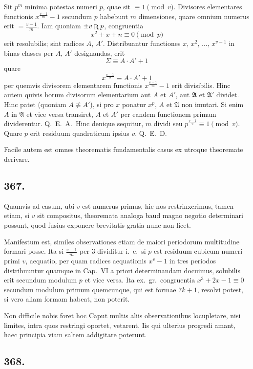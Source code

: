 \documentclass[12pt]{article}
\begin{document}
Sit $p^m$ minima potestas numeri $p$, quae sit $\equiv 1\pmod{v}$. Divisores elementares functionis $x^{\frac{v-1}{m}}-1$ secundum $p$ habebunt $m$ dimensiones, quare omnium numerus erit $=\frac{v-1}{m}$. Iam quoniam $\pm v\mathbin{\raisebox{-1.5pt}{\smash{R}}}p$, congruentia
\[
x^2+x+n\equiv 0 \pmod{p}
\]
erit resolubilis; sint radices $A$, $A'$. Distribuantur functiones $x$, $x^2$, $\ldots$, $x^{v-1}$ in binas classes per $A$, $A'$ designandas, erit
\[
\Sigma\equiv A\cdot A'+1
\]
quare
\[
x^{\frac{v-1}{2}}\equiv A\cdot A'+1
\]
per quemvis divisorem elementarem functionis $x^{\frac{v-1}{m}}-1$ erit divisibilis. Hinc autem quivis horum divisorum elementarium aut $A$ et $A'$, aut $\mathfrak{A}$ et $\mathfrak{A}'$ dividet. Hinc patet (quoniam $A\not\equiv A'$), si pro $x$ ponatur $x^p$, $A$ et $\mathfrak{A}$ non imutari. Si enim $A$ in $\mathfrak{A}$ et vice versa transiret, $A$ et $A'$ per eandem functionem primam dividerentur. Q.~E.~A.~Hinc denique sequitur, $m$ dividi seu $p^{\frac{v-1}{2}}\equiv 1\pmod{v}$. Quare $p$ erit residuum quadraticum ipsius $v$. Q.~E.~D.

Facile autem est omnes theorematis fundamentalis casus ex utroque theoremate derivare.

\subsection*{367.}

Quamvis ad casum, ubi $v$ est numerus primus, hic nos restrinxerimus, tamen etiam, si $v$ sit compositus, theoremata analoga baud magno negotio determinari possunt, quod fusius exponere brevitatis gratia nunc non licet.

Manifestum est, similes observationes etiam de maiori periodorum multitudine formari posse. Ita si $\frac{v-1}{m}$ per $3$ dividitur i.~e.~si $p$ est residuum cubicum numeri primi $v$, aequatio, per quam radices aequationis $x^v-1$ in tres periodos distribuuntur quamque in Cap.~VI a priori determinandam docuimus, solubilis erit secundum modulum $p$ et vice versa. Ita ex.~gr.~congruentia $x^3+2x-1\equiv 0$ secundum modulum primum quemcunque, qui est formae $7k+1$, resolvi potest, si vero aliam formam habeat, non poterit.

Non difficile nobis foret hoc Caput multis aliis observationibus locupletare, nisi limites, intra quos restringi oportet, vetarent. Iis qui ulterius progredi amant, haec principia viam saltem addigitare poterunt.

\subsection*{368.}
\end{document}
